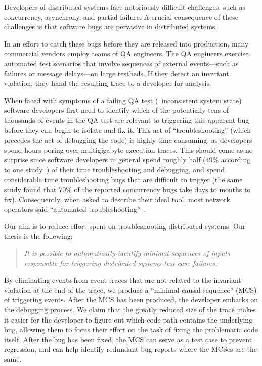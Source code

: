 Developers of distributed systems face notoriously difficult challenges, such as concurrency, asynchrony, and
partial failure. A crucial consequence of these challenges is that software
bugs are pervasive in distributed systems.

In an effort to catch these bugs
before they are released into production, many commercial vendors employ
teams of QA engineers. The QA engineers exercise automated test scenarios that involve
sequences of external events---such as failures or message delays---on large testbeds.
If they detect an invariant violation, they hand the resulting trace to a developer for analysis.

When faced with symptoms of a failing QA test (\eg~inconsistent system state)
software developers first need to identify which of the potentially tens of
thousands of events
in the QA test are relevant to triggering
this apparent bug before they can begin to isolate and fix it.
This act of ``troubleshooting'' (which precedes the act of debugging the
code) is highly time-consuming, as developers spend hours poring
over multigigabyte execution traces. This should come as no surprise since software developers in general spend roughly half (49\% according to one
study~\cite{msoft_concurrency}) of their time troubleshooting and debugging, and spend
considerable time troubleshooting bugs that are difficult to trigger (the same study found
that 70\% of the reported concurrency bugs take days to months to fix).
Consequently, when asked to describe their
ideal tool, most network operators said ``automated
troubleshooting''~\cite{Zeng:Survey}.

Our aim is to reduce effort spent on troubleshooting distributed systems.
Our thesis is the following:
\begin{quote}
{\it
It is possible to
automatically identify minimal sequences of inputs
responsible for triggering
distributed systems test case failures.
}
\end{quote}
By eliminating events from event traces that are not related to the
invariant violation at the end of the trace, we produce a ``minimal
causal sequence'' (MCS) of triggering events. After the MCS has been produced, the developer embarks
on the debugging process. We claim that the greatly reduced size of the
trace makes it easier for the developer to figure out which code path contains
the underlying bug, allowing them to focus their effort on
the task of fixing the problematic code itself. After the bug has been fixed, the MCS
can serve as a test case to prevent regression,
and can help identify redundant bug reports where the MCSes are the same.

